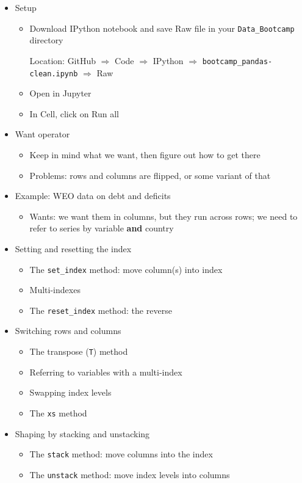 \documentclass[11pt]{article}
\begin{document}
\begin{itemize}
\item Setup
\begin{itemize}
\item Download IPython notebook and save Raw file in your \verb|Data_Bootcamp| directory

Location:  GitHub $\Rightarrow$ Code $\Rightarrow$ IPython $\Rightarrow$
 \verb|bootcamp_pandas-clean.ipynb| $\Rightarrow$ Raw

\item Open in Jupyter
\item In Cell, click on Run all
\end{itemize}

\item {Want operator}
\begin{itemize}
\item Keep in mind what we want, then figure out how to get there
\item Problems:  rows and columns are flipped, or some variant of that
\end{itemize}

\item Example:  WEO data on debt and deficits
\begin{itemize}
\item Wants:  we want them in columns, but they run across rows;
we need to refer to
series by variable {\bf and} country
\end{itemize}

\item Setting and resetting the index
\begin{itemize}
\item The \verb|set_index| method:  move column(s) into index
\item Multi-indexes
\item The \verb|reset_index| method:  the reverse
\end{itemize}

\item Switching rows and columns
\begin{itemize}
\item The transpose ({\tt T}) method
\item Referring to variables with a multi-index
\item Swapping index levels
\item The {\tt xs} method
\end{itemize}

\item Shaping by stacking and unstacking
\begin{itemize}
\item The {\tt stack} method:  move columns into the index
\item The {\tt unstack} method:  move index levels into columns
\end{itemize}


\end{itemize}
\end{document}
